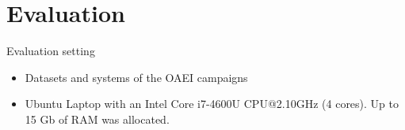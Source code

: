 \documentclass[t]{beamer}
\begin{document}
% 	
%   	
% 
% 



\section{Evaluation}



\begin{frame}{Evaluation setting}

\begin{itemize}
  \item Datasets and systems of the OAEI campaigns
  \item 
Ubuntu Laptop with an Intel Core i7-4600U CPU@2.10GHz (4 cores). Up to 15 Gb of
RAM was allocated.
\end{itemize}



	
	
  	
\end{frame}
\end{document}
